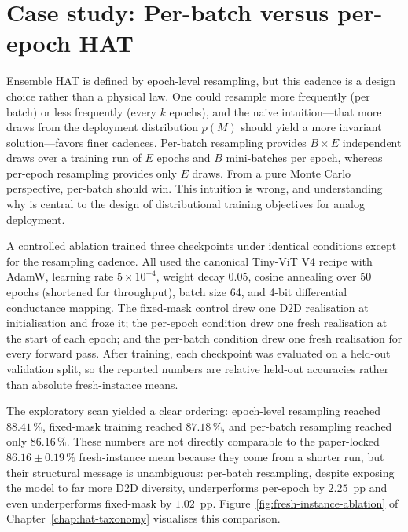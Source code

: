 \section{Case study: Per-batch versus per-epoch HAT}
\label{sec:case-cadence}

Ensemble HAT is defined by epoch-level resampling, but this cadence is a design choice rather than a physical law.  One could resample more frequently (per batch) or less frequently (every $k$ epochs), and the naive intuition---that more draws from the deployment distribution $p(M)$ should yield a more invariant solution---favors finer cadences.  Per-batch resampling provides $B\times E$ independent draws over a training run of $E$ epochs and $B$ mini-batches per epoch, whereas per-epoch resampling provides only $E$ draws.  From a pure Monte Carlo perspective, per-batch should win.  This intuition is wrong, and understanding why is central to the design of distributional training objectives for analog deployment.

A controlled ablation trained three checkpoints under identical conditions except for the resampling cadence.  All used the canonical Tiny-ViT V4 recipe with AdamW, learning rate $5\times10^{-4}$, weight decay $0.05$, cosine annealing over 50 epochs (shortened for throughput), batch size 64, and 4-bit differential conductance mapping.  The fixed-mask control drew one D2D realisation at initialisation and froze it; the per-epoch condition drew one fresh realisation at the start of each epoch; and the per-batch condition drew one fresh realisation for every forward pass.  After training, each checkpoint was evaluated on a held-out validation split, so the reported numbers are relative held-out accuracies rather than absolute fresh-instance means.

The exploratory scan yielded a clear ordering: epoch-level resampling reached $88.41\,\%$, fixed-mask training reached $87.18\,\%$, and per-batch resampling reached only $86.16\,\%$.  These numbers are not directly comparable to the paper-locked $86.16\pm0.19\,\%$ fresh-instance mean because they come from a shorter run, but their structural message is unambiguous: per-batch resampling, despite exposing the model to far more D2D diversity, underperforms per-epoch by $2.25$~pp and even underperforms fixed-mask by $1.02$~pp.  Figure~\ref{fig:fresh-instance-ablation} of Chapter~\ref{chap:hat-taxonomy} visualises this comparison.

